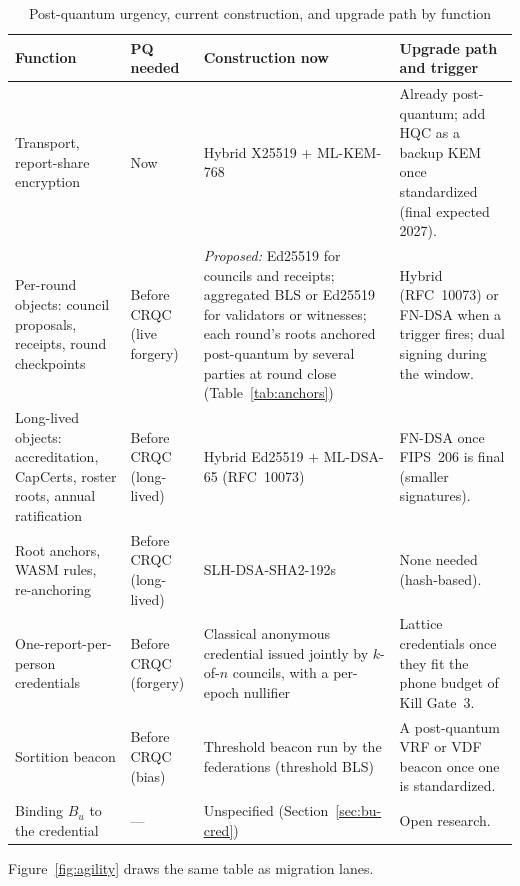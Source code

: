 \documentclass[10pt,twoside,openany]{book}
\theoremstyle{dpepstyle}
\begin{document}
\begin{table}[htbp]
\centering
\caption{Post-quantum urgency, current construction, and upgrade path by function}
\label{tab:pq-urgency}
\scriptsize
\setlength{\tabcolsep}{3pt}
\begin{tabularx}{\textwidth}{L{1.05in} L{0.62in} L{1.45in} Y}
\toprule
\textbf{Function} & \textbf{PQ needed} & \textbf{Construction now} & \textbf{Upgrade path and trigger} \\
\midrule
Transport, report-share encryption & Now & Hybrid X25519 + ML-KEM-768 & Already post-quantum; add HQC as a backup KEM once standardized (final expected 2027). \\
Per-round objects: council proposals, receipts, round checkpoints & Before CRQC (live forgery) & \emph{Proposed:} Ed25519 for councils and receipts; aggregated BLS or Ed25519 for validators or witnesses; each round's roots anchored post-quantum by several parties at round close (Table~\ref{tab:anchors}) & Hybrid (RFC~10073) or FN-DSA when a trigger fires; dual signing during the window. \\
Long-lived objects: accreditation, CapCerts, roster roots, annual ratification & Before CRQC (long-lived) & Hybrid Ed25519 + ML-DSA-65 (RFC~10073) & FN-DSA once FIPS~206 is final (smaller signatures). \\
Root anchors, WASM rules, re-anchoring & Before CRQC (long-lived) & SLH-DSA-SHA2-192s & None needed (hash-based). \\
One-report-per-person credentials & Before CRQC (forgery) & Classical anonymous credential issued jointly by $k$-of-$n$ councils, with a per-epoch nullifier & Lattice credentials once they fit the phone budget of Kill Gate~3. \\
Sortition beacon & Before CRQC (bias) & Threshold beacon run by the federations (threshold BLS) & A post-quantum VRF or VDF beacon once one is standardized. \\
Binding $B_u$ to the credential & --- & Unspecified (Section~\ref{sec:bu-cred}) & Open research. \\
\bottomrule
\end{tabularx}
\end{table}

Figure~\ref{fig:agility} draws the same table as migration lanes.
\end{document}
